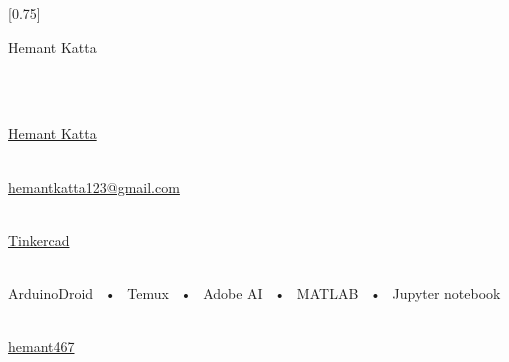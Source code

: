 \documentclass[lighthipster]{simplehipstercv}
\begin{document}
\setlength{\columnsep}{1.5cm}
[0.75]
\begin{paracol}{2}

\paracolbackgroundoptions



\footnotesize
{\setasidefontcolour
\flushright
\begin{center}
    \begin{center}
        Hemant Katta
    \end{center}
\end{center}

\bigskip
{}\\[0.5em]

{\footnotesize
\lorem}
\bigskip

 \\[0.5em]


\href{https://hemantkatta.blogspot.com/}{Hemant Katta}

\bigskip

 \\[0.5em]

\href{mailto:hemantkatta123@gmail.com}{hemantkatta123@gmail.com}

\bigskip

 \\[0.5em]

\href{https://www.tinkercad.com/dashboard?type=circuits&collection=designs}{Tinkercad}

\bigskip



\bigskip

\\[0.5em]

ArduinoDroid ~•~ Temux ~•~ Adobe AI ~•~ MATLAB ~•~ Jupyter notebook

\bigskip



\vspace{4em}
 \\[0.5em]
\href{https://github.com/hemant467}{hemant467}



}
\end{paracol}
\end{document}
